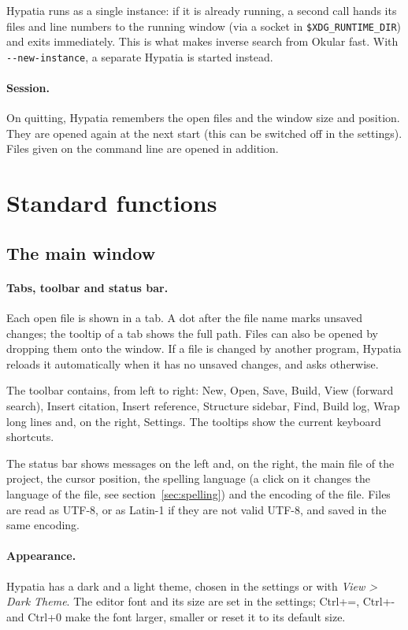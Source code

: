 \documentclass[11pt]{article}
\newcommand{\key}[1]{\textsf{#1}}
\newcommand{\menu}[1]{\textsf{\textit{#1}}}
\begin{document}
    Hypatia runs as a single instance: if it is already running, a second call hands its files and line numbers to the running window (via a socket in \verb+$XDG_RUNTIME_DIR+) and exits immediately. This is what makes inverse search from Okular fast. With \verb+--new-instance+, a separate Hypatia is started instead.

    \paragraph{Session.}     On quitting, Hypatia remembers the open files and the window size and position. They are opened again at the next start (this can be switched off in the settings). Files given on the command line are opened in addition.


    \section{Standard functions}

    \subsection{The main window}

    \paragraph{Tabs, toolbar and status bar.}     Each open file is shown in a tab. A dot after the file name marks unsaved changes; the tooltip of a tab shows the full path. Files can also be opened by dropping them onto the window. If a file is changed by another program, Hypatia reloads it automatically when it has no unsaved changes, and asks otherwise.

    The toolbar contains, from left to right: New, Open, Save, Build, View (forward search), Insert citation, Insert reference, Structure sidebar, Find, Build log, Wrap long lines and, on the right, Settings. The tooltips show the current keyboard shortcuts.

    The status bar shows messages on the left and, on the right, the main file of the project, the cursor position, the spelling language (a click on it changes the language of the file, see section~\ref{sec:spelling}) and the encoding of the file. Files are read as UTF-8, or as Latin-1 if they are not valid UTF-8, and saved in the same encoding.

    \paragraph{Appearance.}     Hypatia has a dark and a light theme, chosen in the settings or with \menu{View > Dark Theme}. The editor font and its size are set in the settings; \key{Ctrl+=}, \key{Ctrl+-} and \key{Ctrl+0} make the font larger, smaller or reset it to its default size.
\end{document}
